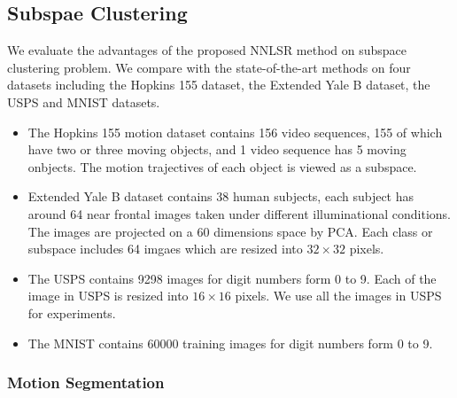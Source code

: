 \documentclass[10pt,twocolumn,letterpaper]{article}
\begin{document}
\subsection{Subspae Clustering}

We evaluate the advantages of the proposed NNLSR method on subspace clustering problem. We compare with the state-of-the-art methods on four datasets including the Hopkins 155 dataset, the Extended Yale B dataset, the USPS and MNIST datasets. 

\begin{itemize}
\item The Hopkins 155 motion dataset contains 156 video sequences, 155 of which have two or three moving objects, and 1 video sequence has 5 moving onbjects. The motion trajectives of each object is viewed as a subspace. 

\item Extended Yale B dataset contains 38 human subjects, each subject has around 64 near frontal images taken under different illuminational conditions. The images are projected on a 60 dimensions space by PCA. Each class or subspace includes 64 imgaes which are resized into $32\times32$ pixels. 

\item The USPS contains 9298 images for digit numbers form 0 to 9. Each of the image in USPS is resized into $16\times16$ pixels. We use all the images in USPS for experiments.

\item The MNIST contains 60000 training images for digit numbers form 0 to 9.
\end{itemize}


\subsubsection{Motion Segmentation}
\end{document}
